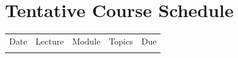 \documentclass{syllabus}
\begin{document}
\section*{\centering Tentative Course Schedule} \vspace{1em}
{\renewcommand{\arraystretch}{1.2}
\renewcommand\multirowsetup{\centering} 
\begin{center}
\begin{tabularx}{1\textwidth}{|c|c|P{2.15cm}X|l|}
\Xhline{2\arrayrulewidth} 
Date & Lecture & Module  & Topics & Due \\
\Xhline{2\arrayrulewidth} 
 
\Xhline{1\arrayrulewidth} 
\end{tabularx}
\end{center}
\restoregeometry 

}
\end{document}
